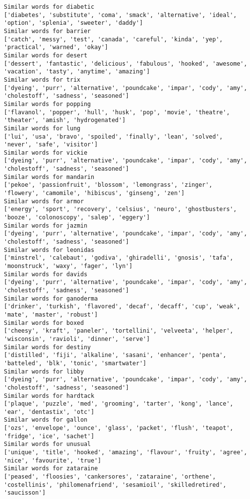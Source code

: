\documentclass[11pt]{article}
\begin{document}
\begin{Verbatim}[commandchars=\\\{\}]
Similar words for diabetic
['diabetes', 'substitute', 'coma', 'smack', 'alternative', 'ideal', 'option', 'splenia', 'sweeter', 'daddy']
Similar words for barrier
['catch', 'messy', 'test', 'canada', 'careful', 'kinda', 'yep', 'practical', 'warned', 'okay']
Similar words for desert
['dessert', 'fantastic', 'delicious', 'fabulous', 'hooked', 'awesome', 'vacation', 'tasty', 'anytime', 'amazing']
Similar words for trix
['dyeing', 'purr', 'alternative', 'poundcake', 'impar', 'cody', 'amy', 'cholestoff', 'sadness', 'seasoned']
Similar words for popping
['flavanol', 'popper', 'hull', 'husk', 'pop', 'movie', 'theatre', 'theater', 'amish', 'hydrogenated']
Similar words for lung
['lui', 'usa', 'bravo', 'spoiled', 'finally', 'lean', 'solved', 'never', 'safe', 'visitor']
Similar words for vickie
['dyeing', 'purr', 'alternative', 'poundcake', 'impar', 'cody', 'amy', 'cholestoff', 'sadness', 'seasoned']
Similar words for mandarin
['pekoe', 'passionfruit', 'blossom', 'lemongrass', 'zinger', 'flowery', 'camomile', 'hibiscus', 'ginseng', 'zen']
Similar words for armor
['energy', 'sport', 'recovery', 'celsius', 'neuro', 'ghostbusters', 'booze', 'colonoscopy', 'salep', 'eggery']
Similar words for jazmin
['dyeing', 'purr', 'alternative', 'poundcake', 'impar', 'cody', 'amy', 'cholestoff', 'sadness', 'seasoned']
Similar words for leonidas
['minstrel', 'calebaut', 'godiva', 'ghiradelli', 'gnosis', 'tafa', 'moonstruck', 'waxy', 'fager', 'lyn']
Similar words for davids
['dyeing', 'purr', 'alternative', 'poundcake', 'impar', 'cody', 'amy', 'cholestoff', 'sadness', 'seasoned']
Similar words for ganoderma
['drinker', 'turkish', 'flavored', 'decaf', 'decaff', 'cup', 'weak', 'mate', 'master', 'robust']
Similar words for boxed
['cheesy', 'kraft', 'paneler', 'tortellini', 'velveeta', 'helper', 'wisconsin', 'ravioli', 'dinner', 'serve']
Similar words for destiny
['distilled', 'fiji', 'alkaline', 'sasani', 'enhancer', 'penta', 'batteled', 'blk', 'tonic', 'smartwater']
Similar words for libby
['dyeing', 'purr', 'alternative', 'poundcake', 'impar', 'cody', 'amy', 'cholestoff', 'sadness', 'seasoned']
Similar words for hardtack
['plaque', 'puzzle', 'med', 'grooming', 'tarter', 'kong', 'lance', 'ear', 'dentastix', 'otc']
Similar words for gallon
['ozs', 'envelope', 'ounce', 'glass', 'packet', 'flush', 'teapot', 'fridge', 'ice', 'sachet']
Similar words for unusual
['unique', 'title', 'hooked', 'amazing', 'flavour', 'fruity', 'agree', 'nice', 'favourite', 'true']
Similar words for zataraine
['peased', 'floosies', 'cankersores', 'zataraine', 'orthene', 'costellinis', 'philomenafriend', 'sesamioil', 'skilledretired', 'saucisson']

\end{Verbatim}
\end{document}
